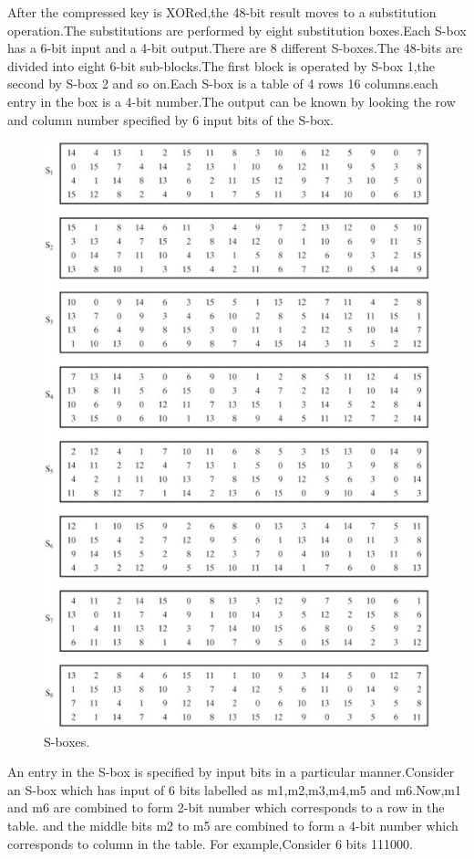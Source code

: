 \documentclass[11pt]{article}
\begin{document}
\quad\quad After the compressed key is XORed,the 48-bit result moves to a substitution operation.The substitutions are performed by eight substitution boxes.Each S-box has a 6-bit input and a 4-bit 
output.There are 8 different S-boxes.The 48-bits are divided into eight 6-bit sub-blocks.The first block is operated by S-box 1,the second by S-box 2 and so on.Each S-box is a table of 4 rows 
16 columns.each entry in the box is a 4-bit number.The output can be known by looking the row and column number specified by 6 input bits of the S-box.\\
  \begin{figure}   
 \begin{center}
\includegraphics[scale=0.5]{s_boxes.jpg}
\end{center}
\caption{S-boxes.}\label{S-boxes}
  \end{figure}
\quad\quad An entry in the S-box is specified by input bits in a particular manner.Consider an S-box which has input of 6 bits labelled as m1,m2,m3,m4,m5 and m6.Now,m1 and m6 are combined to 
form 2-bit number which corresponds to a row in the table. and the middle bits m2 to m5 are combined to form a 4-bit number which corresponds to column in the table.
  For example,Consider 6 bits 111000.
 
\end{document}
